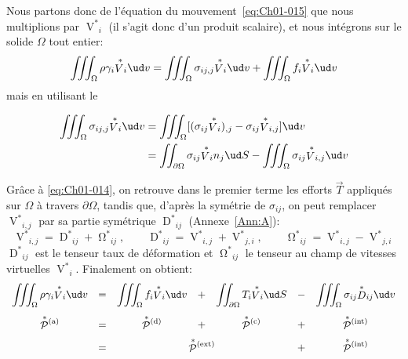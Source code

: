 Nous partons donc de l'équation du mouvement~\eqref{eq:Ch01-015} que nous multiplions par ${\mathop{V}^{*}}_i$ (il s'agit donc d'un produit scalaire), et nous intégrons sur le solide $\Omega$ tout entier:
\begin{equation*}
    \iiint_{\Omega}\rho\gamma_i {\mathop{V}^{*}}_i \ud v=\iiint_{\Omega}\sigma_{ij,j} {\mathop{V}^{*}}_i \ud v+\iiint_{\Omega}f_i {\mathop{V}^{*}}_i \ud v
\end{equation*}
mais en utilisant le
\begin{thm}
\begin{align*}
    \iiint_{\Omega}\sigma_{ij,j} {\mathop{V}^{*}}_i \ud v &= \iiint_{\Omega}[(\sigma_{ij} {\mathop{V}^{*}}_i)_{,j}-\sigma_{ij} {\mathop{V}^{*}}_{i,j}]\ud v\\
    &=\iint_{\partial \Omega}\sigma_{ij} {\mathop{V}^{*}}_i n_j \ud S-\iiint_{\Omega} \sigma_{ij} {\mathop{V}^{*}}_{i,j} \ud v
\end{align*}
\end{thm}
Grâce à \eqref{eq:Ch01-014}, on retrouve dans le premier terme les efforts $\vec{T}$ appliqués sur $\Omega$ à travers $\partial \Omega$, tandis que, d'après la symétrie de $\sigma_{ij}$, on peut remplacer ${\mathop{V}^{*}}_{i,j}$ par sa partie symétrique ${\mathop{D}^{*}}_{ij}$ (Annexe~\ref{Ann:A}):
\begin{equation}
    {\mathop{V}^{{\ast}}}_{i,j}={\mathop{D}^{{\ast}}}_{ij}+{\mathop{\Omega}^{{\ast}}}_{ij},\qquad
    {\mathop{D}^{{\ast}}}_{ij}={\mathop{V}^{{\ast}}}_{i,j}+{\mathop{V}^{{\ast}}}_{j,i},\qquad
    {\mathop{\Omega}^{{\ast}}}_{ij}={\mathop{V}^{{\ast}}}_{i,j}-{\mathop{V}^{{\ast}}}_{j,i}
    \label{eq:Ch01-023}
\end{equation}
$\displaystyle{\mathop{D}^{{\ast}}}_{ij}$ est le tenseur taux de déformation et ${\mathop{\Omega}^{{\ast}}}_{ij}$ le tenseur au champ de vitesses virtuelles ${\mathop{V}^{{\ast}}}_i$.
Finalement on obtient:
\begin{equation}
    \everymath{\displaystyle}
    \begin{array}{ccccccc}
        \iiint_{\Omega}\rho\gamma_i {\mathop{V}^{\ast}}_i \ud v & =& \iiint_{\Omega}f_i {\mathop{V}^{\ast}}_i \ud v & + & \iint_{\partial\Omega}T_i {\mathop{V}^{\ast}}_i \ud S & -& \iiint_{\Omega}\sigma_{ij} {\mathop{D}^{\ast}}_{ij} \ud v\\[13pt]
        \mathop{\mathcal{P}}^{\ast}{\!}^{(\text{a})} & = &\mathop{\mathcal{P}}^{\ast}{\!}^{(\text{d})} & + &\mathop{\mathcal{P}}^{\ast}{\!}^{(\text{c})} & + &\mathop{\mathcal{P}}^{\ast}{\!}^{(\text{int})}\\[6pt]
        & =  & \multicolumn{3}{c}{\mathop{\mathcal{P}}^{\ast}{\!}^{(\text{ext})}} & + &\mathop{\mathcal{P}}^{\ast}{\!}^{(\text{int})}
    \end{array}
    \label{eq:Ch01-024}
\end{equation}
